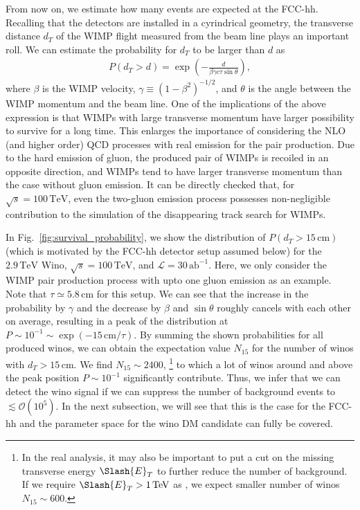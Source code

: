 \documentclass[12pt,twoside,book]{article}
\begin{document}
From now on, we estimate how many events are expected at the FCC-hh.
Recalling that the detectors are installed in a cyrindrical geometry, the transverse distance $d_T$ of the WIMP flight measured from the beam line plays an important roll.
We can estimate the probability for $d_T$ to be larger than $d$ as
\begin{align}
  P(d_T > d) = \exp \left( -\frac{d}{\beta \gamma c \tau \sin\theta} \right),
\end{align}
where $\beta$ is the WIMP velocity, $\gamma \equiv (1-\beta^2)^{-1/2}$, and $\theta$ is the angle between the WIMP momentum and the beam line.
One of the implications of the above expression is that WIMPs with large transverse momentum have larger possibility to survive for a long time.
This enlarges the importance of considering the NLO (and higher order) QCD processes with real emission for the pair production.
Due to the hard emission of gluon, the produced pair of WIMPs is recoiled in an opposite direction, and WIMPs tend to have larger transverse momentum than the case without gluon emission.
It can be directly checked that, for $\sqrt{s}=100\,\mathrm{TeV}$, even the two-gluon emission process possesses non-negligible contribution to the simulation of the disappearing track search for WIMPs.

In Fig.~\ref{fig:survival_probability}, we show the distribution of $P(d_T > 15\,\mathrm{cm})$ (which is motivated by the FCC-hh detector setup assumed below) for the $2.9\,\mathrm{TeV}$ Wino, $\sqrt{s} = 100\,\mathrm{TeV}$, and $\mathcal{L} = 30\,\mathrm{ab}^{-1}$.
Here, we only consider the WIMP pair production process with upto one gluon emission as an example.
Note that $\tau \simeq 5.8\,\mathrm{cm}$ for this setup.
We can see that the increase in the probability by $\gamma$ and the decrease by $\beta$ and $\sin\theta$ roughly cancels with each other on average, resulting in a peak of the distribution at $P \sim 10^{-1} \sim \exp (-15\,\mathrm{cm} / \tau)$.
By summing the shown probabilities for all produced winos, we can obtain the expectation value $N_{15}$ for the number of winos with $d_T > 15\,\mathrm{cm}$.
We find $N_{15} \sim 2400$,
\footnote{
  In the real analysis, it may also be important to put a cut on the missing transverse energy $\Slash{E}_T$ to further reduce the number of background.
  If we require $\Slash{E}_T > 1\,\mathrm{TeV}$ as \cite{Asai:2019wst}, we expect smaller number of winos $N_{15} \sim 600$.
}
to which a lot of winos around and above the peak position $P \sim 10^{-1}$ significantly contribute.
Thus, we infer that we can detect the wino signal if we can suppress the number of background events to $\lesssim \mathcal{O}(10^5)$.
In the next subsection, we will see that this is the case for the FCC-hh and the parameter space for the wino DM candidate can fully be covered.
\end{document}

